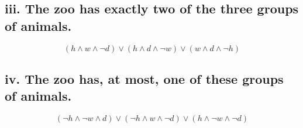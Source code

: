\documentclass{article}
\begin{document}
\subsection*{iii. The zoo has exactly two of the three groups of animals.}
\[
(h \land w \land \neg d) \lor (h \land d \land \neg w) \lor (w \land d \land \neg h)
\]

\subsection*{iv. The zoo has, at most, one of these groups of animals.}
\[
(\neg h \land \neg w \land d) \lor (\neg h \land w \land \neg d) \lor (h \land \neg w \land \neg d)
\]
\end{document}
